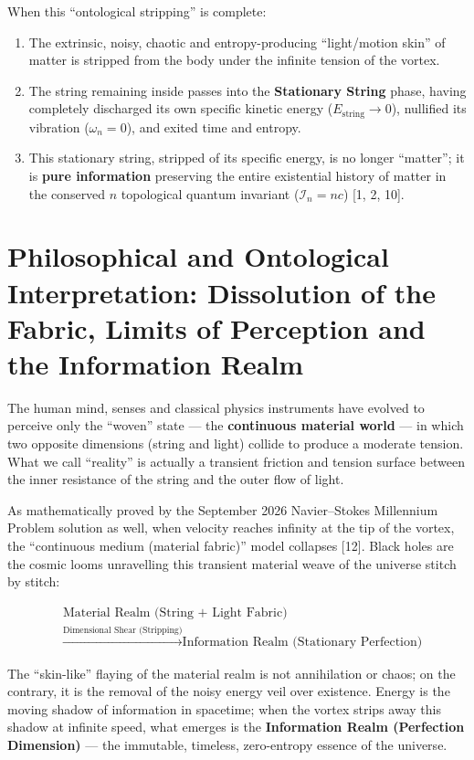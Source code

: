 \documentclass[12pt,a4paper]{article}
\begin{document}
When this ``ontological stripping'' is complete:
\begin{enumerate}
    \item The extrinsic, noisy, chaotic and entropy-producing ``light/motion skin'' of matter is stripped from the body under the infinite tension of the vortex.
    \item The string remaining inside passes into the \textbf{Stationary String} phase, having completely discharged its own specific kinetic energy ($E_{\text{string}} \to 0$), nullified its vibration ($\omega_n = 0$), and exited time and entropy.
    \item This stationary string, stripped of its specific energy, is no longer ``matter''; it is \textbf{pure information} preserving the entire existential history of matter in the conserved $n$ topological quantum invariant ($\mathcal{I}_n = n c$) [1, 2, 10].
\end{enumerate}

\section{Philosophical and Ontological Interpretation: Dissolution of the Fabric, Limits of Perception and the Information Realm}

The human mind, senses and classical physics instruments have evolved to perceive only the ``woven'' state --- the \textbf{continuous material world} --- in which two opposite dimensions (string and light) collide to produce a moderate tension. What we call ``reality'' is actually a transient friction and tension surface between the inner resistance of the string and the outer flow of light.

As mathematically proved by the September 2026 Navier--Stokes Millennium Problem solution as well, when velocity reaches infinity at the tip of the vortex, the ``continuous medium (material fabric)'' model collapses [12]. Black holes are the cosmic looms unravelling this transient material weave of the universe stitch by stitch:

\[
\begin{aligned}
&\text{Material Realm (String + Light Fabric)} \\
&\xrightarrow{\text{Dimensional Shear (Stripping)}} \text{Information Realm (Stationary Perfection)}
\end{aligned}
\]

The ``skin-like'' flaying of the material realm is not annihilation or chaos; on the contrary, it is the removal of the noisy energy veil over existence. Energy is the moving shadow of information in spacetime; when the vortex strips away this shadow at infinite speed, what emerges is the \textbf{Information Realm (Perfection Dimension)} --- the immutable, timeless, zero-entropy essence of the universe.
\end{document}
